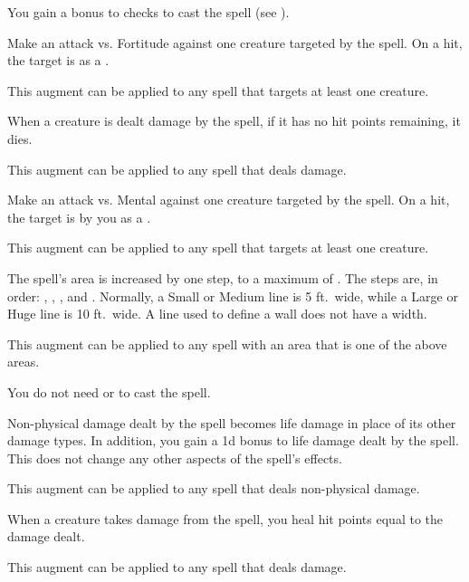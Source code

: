         {
             You gain a  bonus to  checks to cast the spell (see ).

             Make an attack vs. Fortitude against one creature targeted by the spell.
            On a hit, the target is  as a .
            \par This augment can be applied to any spell that targets at least one creature.

             When a creature is dealt damage by the spell, if it has no hit points remaining, it dies.
            \par This augment can be applied to any spell that deals damage.

             Make an attack vs. Mental against one creature targeted by the spell.
            On a hit, the target is  by you as a .
            \par This augment can be applied to any spell that targets at least one creature.

             The spell's area is increased by one step, to a maximum of \areahuge.
            The steps are, in order: \areasmall, \areamed, \arealarge, and \areahuge.
            Normally, a Small or Medium line is 5 ft.\ wide, while a Large or Huge line is 10 ft.\ wide.
            A line used to define a wall does not have a width.
            \par This augment can be applied to any spell with an area that is one of the above areas.

             You do not need  or  to cast the spell.

             Non-physical damage dealt by the spell becomes life damage in place of its other damage types.
            In addition, you gain a \plus1d bonus to life damage dealt by the spell.
            This does not change any other aspects of the spell's effects.
            \par This augment can be applied to any spell that deals non-physical damage.

             When a creature takes damage from the spell, you heal hit points equal to the damage dealt.
            \par This augment can be applied to any spell that deals damage.

}

